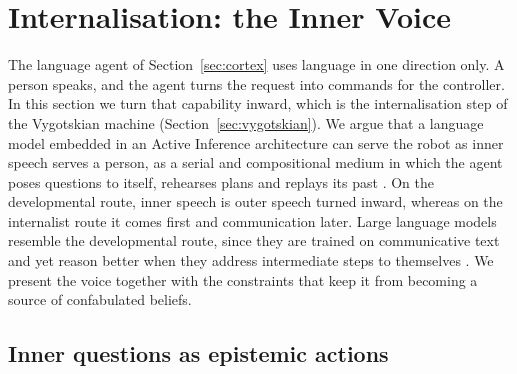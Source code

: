 %

\section{Internalisation: the Inner Voice}
\label{sec:inner_speech}

The language agent of Section~\ref{sec:cortex} uses language in one direction only. A person speaks, and the agent
turns the request into commands for the controller. In this section we turn that capability inward, which is the
internalisation step of the Vygotskian machine (Section~\ref{sec:vygotskian}). We argue that a language model
embedded in an Active Inference architecture can serve the robot as inner speech serves a person, as a
serial and compositional medium in which the agent poses questions to itself, rehearses plans and replays its past
\cite{vygotsky1986thought, aldersonday2015inner}. On the developmental route, inner speech is outer speech turned
inward, whereas on the internalist route it comes first and communication later. Large language models resemble the
developmental route, since they are trained on communicative text and yet reason better when they address
intermediate steps to themselves \cite{wei2022chain}. We present the voice together with the constraints that keep
it from becoming a source of confabulated beliefs.

\subsection{Inner questions as epistemic actions}
\label{sec:inner_speech:questions}

